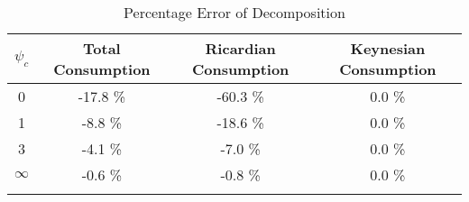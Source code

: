   \begin{table}
\begin{center}
    \caption{Percentage Error of Decomposition}\label{table:error}
\begin{tabular}{cccc}  
$\psi_c$ & Total Consumption & Ricardian Consumption & Keynesian Consumption 
\\ \toprule  
0 & -17.8 \%  & -60.3 \% & 0.0 \% \\ 
1 & -8.8 \%  & -18.6 \% & 0.0 \% \\ 
3 & -4.1 \%  & -7.0 \% & 0.0 \% \\ 
$\infty$ & -0.6 \%  & -0.8 \% & 0.0 \% \\ 
\\ \bottomrule 
 \end{tabular}
\end{center}
\end{table}
